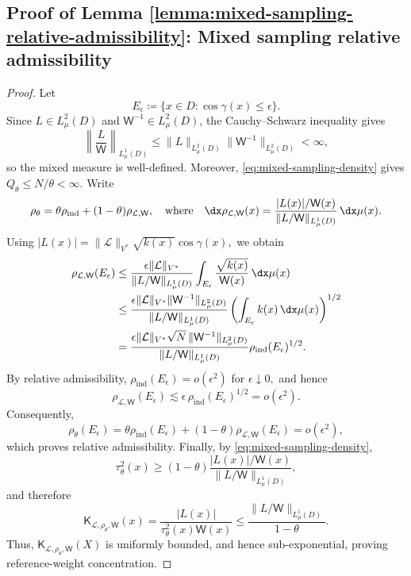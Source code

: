 \documentclass[10pt,dvipsnames]{amsart}
\begin{document}
\subsection{Proof of Lemma \ref{lemma:mixed-sampling-relative-admissibility}: Mixed sampling relative admissibility}
\label{app:mixed-sampling-relative-admissibility}
\mixedSamplingRelativeAdmissibility*
\begin{proof}
Let
\[
    E_\epsilon
    \coloneqq
    \{x\in D:\cos\gamma(x)\leq\epsilon\}.
\]
Since \(L\in L^2_\mu(D)\) and
\(\mathsf W^{-1}\in L^2_\mu(D)\), the Cauchy--Schwarz inequality gives
\[
    \left\|\frac{L}{\mathsf W}\right\|_{L^1_\mu(D)}
    \leq
    \|L\|_{L^2_\mu(D)}
    \|\mathsf W^{-1}\|_{L^2_\mu(D)}
    <\infty,
\]
so the mixed measure is well-defined. Moreover,
\eqref{eq:mixed-sampling-density} gives
\(Q_\theta\leq N/\theta<\infty\). Write
\[
    \rho_\theta
    =
    \theta\rho_{\mathrm{ind}}
    +
    (1-\theta)\rho_{\mathcal L,\mathsf W},
    \quad\text{where}\quad
    \dx\rho_{\mathcal L,\mathsf W}(x)
    =
    \frac{|L(x)|/\mathsf W(x)}
    {\|L/\mathsf W\|_{L^1_\mu(D)}}\,\dx\mu(x).
\]
Using
\(
    |L(x)|
    =
    \|\mathcal L\|_{V^*}\sqrt{k(x)}\cos\gamma(x),
\)
we obtain
\begin{align*}
    \rho_{\mathcal L,\mathsf W}(E_\epsilon)
    &\leq
    \frac{
        \epsilon\|\mathcal L\|_{V^*}
    }{
        \|L/\mathsf W\|_{L^1_\mu(D)}
    }
    \int_{E_\epsilon}
        \frac{\sqrt{k(x)}}{\mathsf W(x)}
    \,\dx\mu(x) \\
    &\leq
    \frac{
        \epsilon\|\mathcal L\|_{V^*}
        \|\mathsf W^{-1}\|_{L^2_\mu(D)}
    }{
        \|L/\mathsf W\|_{L^1_\mu(D)}
    }
    \left(
        \int_{E_\epsilon}k(x)\,\dx\mu(x)
    \right)^{1/2} \\
    &=
    \frac{
        \epsilon\|\mathcal L\|_{V^*}
        \sqrt N\,
        \|\mathsf W^{-1}\|_{L^2_\mu(D)}
    }{
        \|L/\mathsf W\|_{L^1_\mu(D)}
    }
    \rho_{\mathrm{ind}}(E_\epsilon)^{1/2}.
\end{align*}
By relative admissibility,
\(
    \rho_{\mathrm{ind}}(E_\epsilon)
    =
    o(\epsilon^2)
    \) for \( \epsilon\downarrow0,
\)
and hence
\[
    \rho_{\mathcal L,\mathsf W}(E_\epsilon)
    \lesssim
    \epsilon\,
    \rho_{\mathrm{ind}}(E_\epsilon)^{1/2}
    =
    o(\epsilon^2).
\]
Consequently,
\[
    \rho_\theta(E_\epsilon)
    =
    \theta\rho_{\mathrm{ind}}(E_\epsilon)
    +
    (1-\theta)
    \rho_{\mathcal L,\mathsf W}(E_\epsilon)
    =
    o(\epsilon^2),
\]
which proves relative admissibility. Finally, by \eqref{eq:mixed-sampling-density},
\[
    \tau_\theta^2(x)
    \geq
    (1-\theta)
    \frac{|L(x)|/\mathsf W(x)}
    {\|L/\mathsf W\|_{L^1_\mu(D)}},
\]
and therefore
\[
    \mathsf K_{\mathcal L,\rho_\theta,\mathsf W}(x)
    =
    \frac{|L(x)|}
    {\tau_\theta^2(x)\mathsf W(x)}
    \leq
    \frac{
        \|L/\mathsf W\|_{L^1_\mu(D)}
    }{
        1-\theta
    }.
\]
Thus,
\(\mathsf K_{\mathcal L,\rho_\theta,\mathsf W}(X)\) is uniformly bounded,
and hence sub-exponential, proving reference-weight concentration.
\end{proof}
\end{document}
